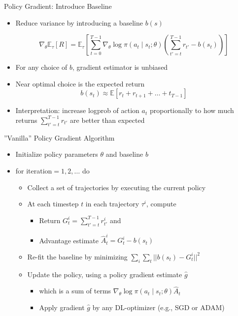 \begin{frame}[c]{Policy Gradient: Introduce Baseline}
	
\begin{itemize}
	\item Reduce variance by introducing a baseline $b(s)$
	
	$$\nabla_\theta \mathbb{E}_\tau [R] = \mathbb{E}_\tau \left[ \sum_{t=0}^{T-1} \nabla_\theta \log \pi(a_t \mid s_t; \theta) \left( \sum_{t'=t}^{T-1} r_{t'} - b(s_t) \right) \right] $$
	
	\item For any choice of $b$, gradient estimator is unbiased
	\item Near optimal choice is the expected return
	$$b(s_t) \approx \mathbb{E} [r_t + r_{t+1} +\ldots + t_{T-1}] $$
	
	\item Interpretation: increase logprob of action $a_t$ proportionally to how much returns $\sum_{t'=t}^{T-1} r_{t'}$ are better than expected
	
\end{itemize}
	
	
\end{frame}
\begin{frame}[c]{”Vanilla” Policy Gradient Algorithm}
	
	\begin{itemize}
		\item Initialize policy parameters $\theta$ and baseline $b$
		\item for iteration$=1,2,\ldots$ do
		\begin{itemize}
			\item Collect a set of trajectories by executing the current policy
			\item At each timestep $t$ in each trajectory $\tau^i$, compute
			\begin{itemize}
				\item Return $G_t^i= \sum_{t'=t}^{T-1} r_{t'}^i$ and
				\item Advantage estimate $\hat{A}^i_t = G^i_t - b(s_t)$
			\end{itemize}
			\item Re-fit the baseline by minimizing $\sum_i \sum_t || b(s_t) - G^i_t||^2$
			\item Update the policy, using a policy gradient estimate $\hat{g}$
			\begin{itemize}
				\item which is a sum of terms $\nabla_\theta \log \pi(a_t \mid s_t; \theta) \hat{A}_t$
				\item Apply gradient $\hat{g}$ by any DL-optimizer (e.g., SGD or ADAM)
			\end{itemize}
		\end{itemize}
		
	\end{itemize}
	
	
\end{frame}
